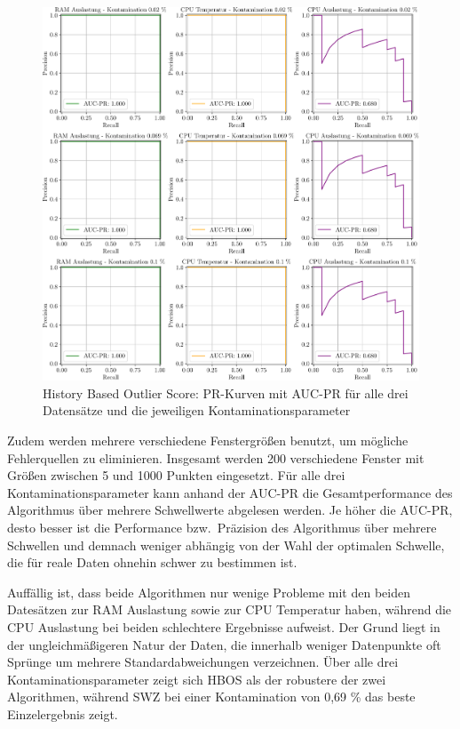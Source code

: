 \begin{figure}[t!]
    \centering
        \includegraphics[width=1\linewidth]{ch5_anomalieerkennung/abbildungen/HBOS_AUC_PR.pdf}
    \caption{\centering History Based Outlier Score: PR-Kurven mit AUC-PR für alle drei Datensätze und die jeweiligen Kontaminationsparameter}
    \label{fig:swz_auc_pr}
\end{figure}

Zudem werden mehrere verschiedene Fenstergrößen benutzt, um mögliche Fehlerquellen zu eliminieren. Insgesamt werden 200 verschiedene Fenster
mit Größen zwischen 5 und 1000 Punkten eingesetzt. Für alle drei Kontaminationsparameter kann anhand der AUC-PR die Gesamtperformance des
Algorithmus über mehrere Schwellwerte abgelesen werden. Je höher die AUC-PR, desto besser ist die Performance bzw.~Präzision des Algorithmus
über mehrere Schwellen und demnach weniger abhängig von der Wahl der optimalen Schwelle, die für reale Daten ohnehin schwer zu bestimmen ist.

Auffällig ist, dass beide Algorithmen nur wenige Probleme mit den beiden Datesätzen zur RAM Auslastung sowie zur CPU Temperatur haben, während
die CPU Auslastung bei beiden schlechtere Ergebnisse aufweist. Der Grund liegt in der ungleichmäßigeren Natur der Daten, die innerhalb weniger
Datenpunkte oft Sprünge um mehrere Standardabweichungen verzeichnen. Über alle drei Kontaminationsparameter zeigt sich HBOS als der robustere
der zwei Algorithmen, während SWZ bei einer Kontamination von 0,69 \%  das beste Einzelergebnis zeigt.

